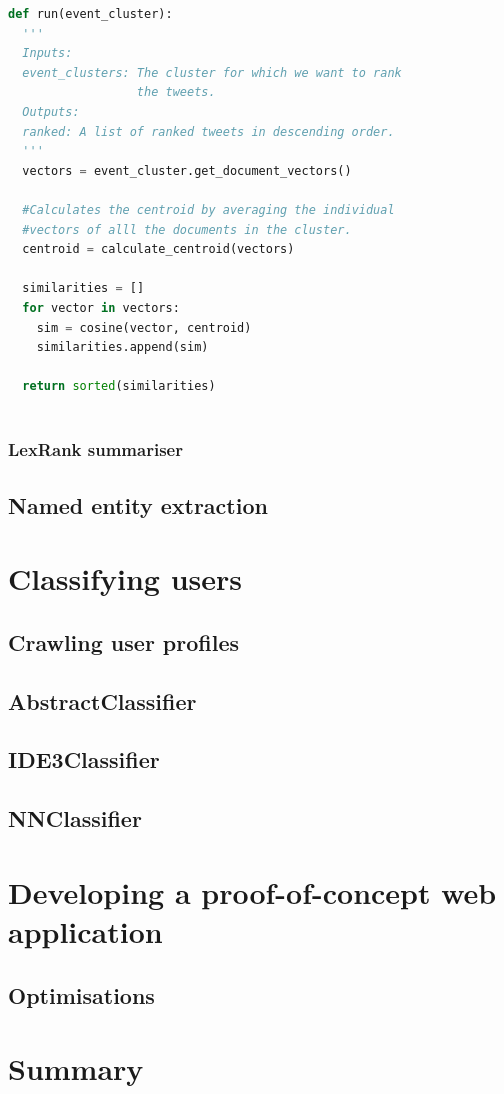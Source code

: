 \begin{lstlisting}[language=Python, label=CentroidSummariserSnippet, caption=Pseudocode for the centoid-based summariser.]
def run(event_cluster):
  '''
  Inputs:
  event_clusters: The cluster for which we want to rank 
                  the tweets.
  Outputs:
  ranked: A list of ranked tweets in descending order. 
  '''        
  vectors = event_cluster.get_document_vectors()
  
  #Calculates the centroid by averaging the individual
  #vectors of alll the documents in the cluster.
  centroid = calculate_centroid(vectors)
  
  similarities = []
  for vector in vectors:
    sim = cosine(vector, centroid)
    similarities.append(sim)
  
  return sorted(similarities)
  
\end{lstlisting}

\subsubsection{LexRank summariser}
\subsection{Named entity extraction}

\section{Classifying users}
\subsection{Crawling user profiles}
\subsection{AbstractClassifier}
\subsection{IDE3Classifier}
\subsection{NNClassifier}

\section{Developing a proof-of-concept web application}\label{WebApp}
\subsection{Optimisations}

\section{Summary}



